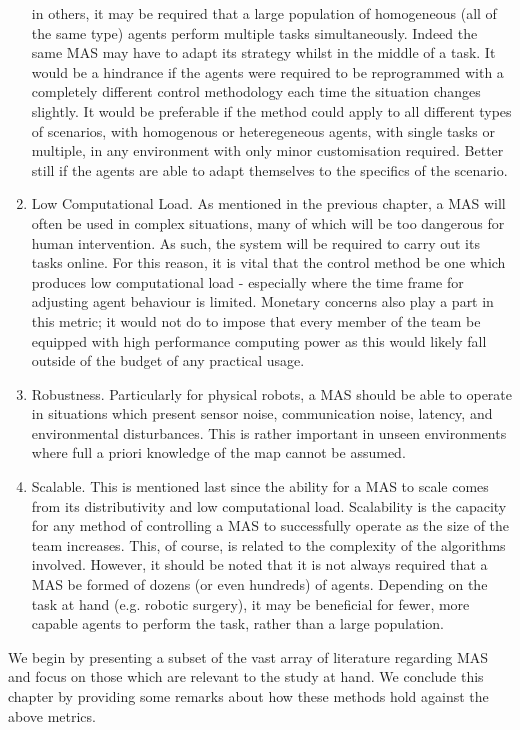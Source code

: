 \documentclass[.../main.tex]{subfiles}
\begin{document}
\begin{enumerate}
    in others, it may be required that a large population of homogeneous (all of the same type)
    agents perform multiple tasks simultaneously. Indeed the same MAS may have to adapt its
    strategy whilst in the middle of a task. It would be a hindrance if the agents were required to
    be reprogrammed with a completely different control methodology each time the situation changes
    slightly. It would be preferable if the method could apply to all different types of scenarios,
    with homogenous or heteregeneous agents, with single tasks or multiple, in any environment with
    only minor customisation required. Better still if the agents are able to adapt themselves to
    the specifics of the scenario.
    \item Low Computational Load. As mentioned in the previous chapter, a MAS will often be used in
    complex situations, many of which will be too dangerous for human intervention. As such, the
    system will be required to carry out its tasks online. For this reason, it is vital that the
    control method be one which produces low computational load - especially where the time frame
    for adjusting agent behaviour is limited. Monetary concerns also play a part in this metric; it
    would not do to impose that every member of the team be equipped with high performance computing
    power as this would likely fall outside of the budget of any practical usage.
    \item Robustness. Particularly for physical robots, a MAS should be able to operate in
    situations which present sensor noise, communication noise, latency, and environmental
    disturbances. This is rather important in unseen environments where full a priori knowledge of
    the map cannot be assumed.
    \item Scalable. This is mentioned last since the ability for a MAS to scale comes from its
    distributivity  and low computational load. Scalability is the capacity for any method of
    controlling a MAS to successfully operate as the size of the team increases. This, of course, is
    related to the complexity of the algorithms involved. However, it should be noted that it is not
    always required that a MAS be formed of dozens (or even hundreds) of agents. Depending on the
    task at hand (e.g. robotic surgery), it may be beneficial for fewer, more capable agents to
    perform the task, rather than a large population. 
\end{enumerate}

We begin by presenting a subset of the vast array of literature regarding MAS and focus on those
which are relevant to the study at hand. We conclude this chapter by providing some remarks about
how these methods hold against the above metrics.
\end{document}
